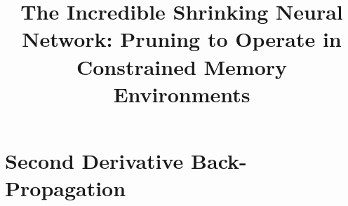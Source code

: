 \documentclass[wcp]{jmlr}
\title[The Incredible Shrinking Neural Network]{The Incredible Shrinking Neural Network: Pruning to Operate in Constrained Memory Environments}
\begin{document}
\maketitle

\appendix

\section{Second Derivative Back-Propagation}\label{apd:first}





\end{document}

